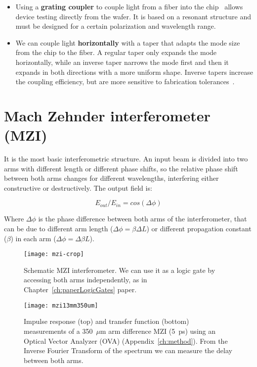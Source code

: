 \begin{itemize}
 \item Using a \textbf{grating coupler} to couple light from a fiber into the chip~\cite{1017613} allows device testing directly from the wafer. It is based on a resonant structure and must be designed for a certain polarization and wavelength range.
 
 \item We can couple light \textbf{horizontally} with a taper that adapts the mode size from the chip to the fiber. %
 A regular taper only expands the mode horizontally, while an inverse taper narrows the mode first and then it expands in both directions with a more uniform shape.
 Inverse tapers increase the coupling efficiency, but are more sensitive to fabrication tolerances~\cite{Shoji:02}.
 
\end{itemize}



\section{Mach Zehnder interferometer (MZI)}
It is the most basic interferometric structure.
An input beam is divided into two arms with different length or different phase shifts, so the relative phase shift between both arms changes for different wavelengths, interfering either constructive or destructively. The output field is:

\begin{equation}
	E_{out}/E_{in}=cos(\Delta \phi)
\end{equation} 

Where $\Delta \phi$ is the phase difference between both arms of the interferometer, that can be due to different arm length ($\Delta \phi = \beta \Delta L$) or different propagation constant ($\beta$) in each arm ($\Delta \phi = \Delta \beta L$).

\begin{figure}[htb]
    \centering
    \texttt{[image: mzi-crop]}
    \caption{Schematic MZI interferometer. We can use it as a logic gate by accessing both arms independently, as in Chapter~\ref{ch:paperLogicGates} paper.}
    \label{fig:mziSchematic}
\end{figure}


\begin{figure}[htb]
    \centering
    \texttt{[image: mzi13mm350um]}
      \caption{Impulse response (top) and transfer function (bottom) measurements of a 350~$\mu$m arm difference MZI (5~ps) using an Optical Vector Analyzer (OVA) (Appendix~\ref{ch:method}). From the Inverse Fourier Transform of the spectrum we can measure the delay between both arms.}
    \label{fig:mzi13mm350um}
\end{figure}


